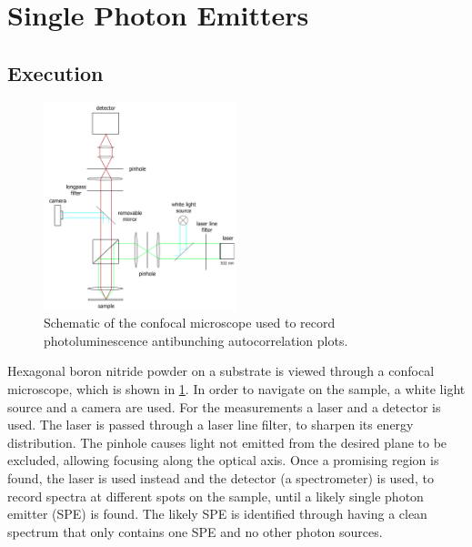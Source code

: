 \section{Single Photon Emitters}
\label{sec:SPE}

\subsection{Execution}

\begin{figure}[H]
    \centering
    \includegraphics[width=0.5\textwidth]{img/setup2.png}
    \caption{Schematic of the confocal microscope used to record photoluminescence antibunching autocorrelation plots.}
    \label{fig_confocal}
\end{figure}

Hexagonal boron nitride powder on a substrate is viewed through a confocal microscope, which is shown in \cref{fig_confocal}.
In order to navigate on the sample, a white light source and a camera are used.
For the measurements a laser and a detector is used.
The laser is passed through a laser line filter, to sharpen its energy distribution.
The pinhole causes light not emitted from the desired plane to be excluded, allowing focusing along the optical axis.
Once a promising region is found, the laser is used instead and the detector (a spectrometer) is used, to record spectra at different spots on the sample, until a likely single photon emitter (SPE) is found.
The likely SPE is identified through having a clean spectrum that only contains one SPE and no other photon sources.%

